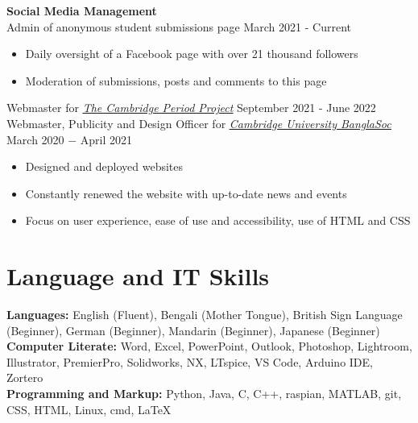 \documentclass{article}
\begin{document}
\textbf{Social Media Management}\\
Admin of anonymous student submissions page \hfill March 2021 - Current
\begin{itemize}
    \item Daily oversight of a Facebook page with over 21 thousand followers
    \item Moderation of submissions, posts and comments to this page
\end{itemize}
Webmaster for \href{http://tcpp.soc.srcf.net/}{\underline{\textit{The Cambridge Period Project}}} \hfill September 2021 - June 2022\\ 
Webmaster, Publicity and Design Officer for \href{https://cambridgebanglasoc.org/}{\underline{\textit{Cambridge University BanglaSoc}}} \hfill March 2020 $-$ April 2021
\begin{itemize}
    \item Designed and deployed websites
    \item Constantly renewed the website with up-to-date news and events 
    \item Focus on user experience, ease of use and accessibility, use of HTML and CSS
\end{itemize} \medskip

\vspace{-.5\baselineskip}
\hrulefill
\vspace{-.5\baselineskip}

\section*{Language and IT Skills}
\textbf{Languages:} English (Fluent), Bengali (Mother Tongue), British Sign Language (Beginner), German (Beginner), Mandarin (Beginner), Japanese (Beginner) \\
\textbf{Computer Literate:} Word, Excel, PowerPoint, Outlook, Photoshop, Lightroom, Illustrator, PremierPro, Solidworks, NX, LTspice, VS Code, Arduino IDE, Zortero\\
\textbf{Programming and Markup:} Python, Java, C, C++, raspian, MATLAB, git, CSS, HTML, Linux, cmd, \LaTeX \medskip

\vspace{-.5\baselineskip}
\hrulefill
\vspace{-.5\baselineskip}
\end{document}
